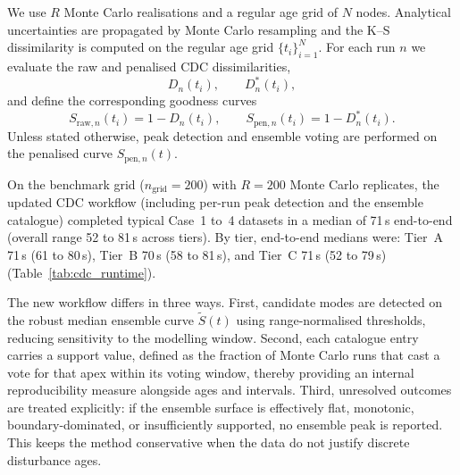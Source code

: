 
We use $R$ Monte Carlo realisations and a regular age grid of $N$ nodes. Analytical uncertainties are propagated by Monte Carlo resampling and the K--S dissimilarity is computed on the regular age grid $\{t_i\}_{i=1}^N$. For each run $n$ we evaluate the raw and penalised CDC dissimilarities,
\begin{equation}
  D_n(t_i), \qquad D^{*}_n(t_i),
\end{equation}
and define the corresponding goodness curves
\begin{equation}
  S_{\mathrm{raw},n}(t_i)=1-D_n(t_i),\qquad
  S_{\mathrm{pen},n}(t_i)=1-D^{*}_n(t_i).
\end{equation}
Unless stated otherwise, peak detection and ensemble voting are performed on the penalised curve $S_{\mathrm{pen},n}(t)$.

On the benchmark grid (\(n_{\mathrm{grid}}=200\)) with \(R{=}200\) Monte Carlo replicates, the updated CDC workflow (including per-run peak detection and the ensemble catalogue) completed typical Case~1 to~4 datasets in a median of 71\,\unit{s} end-to-end (overall range 52 to 81\,\unit{s} across tiers). By tier, end-to-end medians were: Tier~A 71\,\unit{s} (61 to 80\,\unit{s}), Tier~B 70\,\unit{s} (58 to 81\,\unit{s}), and Tier~C 71\,\unit{s} (52 to 79\,\unit{s}) (Table~\ref{tab:cdc_runtime}).

The new workflow differs in three ways. First, candidate modes are detected on the robust median ensemble curve $\tilde S(t)$ using range-normalised thresholds, reducing sensitivity to the modelling window. Second, each catalogue entry carries a support value, defined as the fraction of Monte Carlo runs that cast a vote for that apex within its voting window, thereby providing an internal reproducibility measure alongside ages and intervals. Third, unresolved outcomes are treated explicitly: if the ensemble surface is effectively flat, monotonic, boundary-dominated, or insufficiently supported, no ensemble peak is reported. This keeps the method conservative when the data do not justify discrete disturbance ages.

